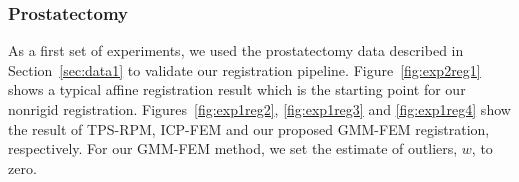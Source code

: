 \documentclass[journal]{IEEEtran}
\begin{document}
\subsubsection{Prostatectomy}
As a first set of experiments, we used the prostatectomy data described in Section~\ref{sec:data1} to validate our registration pipeline. Figure~\ref{fig:exp2reg1} shows a typical affine registration result which is the starting point for our nonrigid registration. Figures~\ref{fig:exp1reg2}, \ref{fig:exp1reg3} and \ref{fig:exp1reg4} show the result of TPS-RPM, ICP-FEM and our proposed GMM-FEM registration, respectively. For our GMM-FEM method, we set the estimate of outliers, $w$, to zero.
\begin{figure}
	\centering
	 \hfill
	\\
	\hfill

\end{figure}
\end{document}
